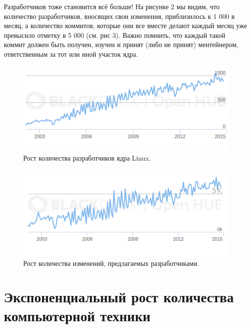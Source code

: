 \documentclass[a4paper, 12pt]{article} %
\begin{document}
Разработчиков тоже становится всё больше! На рисунке 2 мы видим, что количество разработчиков, вносящих свои изменения, приблизилось к 1 000 в месяц, а количество коммитов, которые они все вместе делают каждый месяц уже превысило отметку в 5 000 (см. рис 3). Важно помнить, что каждый такой коммит должен быть получен, изучен и принят (либо не принят) ментейнером, ответственным за тот или иной участок ядра.

\begin{figure}[h!]
\centering
\includegraphics[scale=0.8]{res/pic002}
\caption{Рост количества разработчиков ядра Linux.}
\end{figure}

\begin{figure}[h!]
\centering
\includegraphics[scale=0.8]{res/pic003}
\caption{Рост количества изменений, предлагаемых разработчиками.}
\end{figure}


\section*{Экспоненциальный рост количества\\ компьютерной техники}
\end{document}
